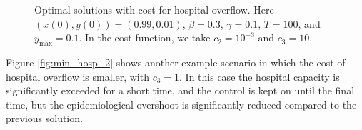 \documentclass[english,12pt,letter]{article}
\newcommand{\ymax}{y_\text{max}}
\begin{document}
\begin{figure}
    \centering
    \caption{Optimal solutions with cost for hospital overflow.  Here $(x(0),y(0)) = (0.99,0.01)$, $\beta=0.3$, $\gamma=0.1$, $T=100$,
        and $\ymax=0.1$.
        In the cost function, we take $c_2=10^{-3}$ and $c_3=10$.\label{fig:min_hosp_1}}
\end{figure}

Figure \ref{fig:min_hosp_2} shows another example scenario in which the cost of hospital overflow is smaller,
with $c_3=1$.  In this case the hospital capacity is significantly exceeded for a short time,
and the control is kept on until the final time, but the epidemiological overshoot
is significantly reduced compared to the previous solution.
\end{document}
